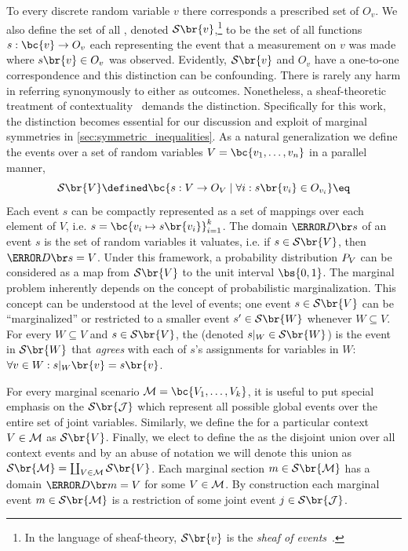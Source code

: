 \documentclass[aps, 10pt, english, twoside, pra, nofootinbib, tightenlines, longbibliography, superscriptaddress]{revtex4-1}
\renewcommand{\Events}[1]{\mathcal{S}\br{#1}} %
\begin{document}
    To every discrete random variable $v$ there corresponds a prescribed set of  $O_v$. We also define the set of all , denoted $\Events{v}$,\footnote{In the language of sheaf-theory, $\Events{v}$ is the \textit{sheaf of events}~\cite{Abramsky_2011}.} to be the set of all functions $s : \bc{v} \to O_v$ each representing the event that a measurement on $v$ was made where $s\br{v} \in O_v$ was observed. Evidently, $\Events{v}$ and $O_v$ have a one-to-one correspondence and this distinction can be confounding. There is rarely any harm in referring synonymously to either as outcomes. Nonetheless, a sheaf-theoretic treatment of contextuality~\cite{Abramsky_2011} demands the distinction.
    Specifically for this work, the distinction becomes essential for our discussion and exploit of marginal symmetries in \cref{sec:symmetric_inequalities}. As a natural generalization we define the events over a set of random variables $V = \bc{v_1, \ldots, v_n}$ in a parallel manner,
    \[ \Events{V} \defined \bc{s: V \to O_{V} \mid \forall i : s\br{v_i} \in O_{v_i} } \eq \label{eq:outcome_space}\]
    Each event $s$ can be compactly represented as a set of mappings over each element of $V$, i.e. $s = \bc{v_i\mapsto s\br{v_i}}_{i = 1}^{k}$. The domain $\Dom{s}$ of an event $s$ is the set of random variables it valuates, i.e. if $s \in \Events{V}$, then $\Dom{s} = V$. Under this framework, a probability distribution $\prob[V]$ can be considered as a map from $\Events{V}$ to the unit interval $\bs{0,1}$.
    The marginal problem inherently depends on the concept of probabilistic marginalization. This concept can be understood at the level of events; one event $s \in \Events{V}$ can be ``marginalized'' or restricted to a smaller event $s' \in \Events{W}$ whenever $W \subseteq V$. For every $W \subseteq V$ and $s \in \Events{V}$, the  (denoted $s|_{W} \in \Events{W}$) is the event in $\Events{W}$ that \textit{agrees} with each of $s$'s assignments for variables in $W$: $\forall v \in W : s|_{W}\br{v} = s\br{v}$.

    For every marginal scenario $\mscenario = \bc{V_1, \ldots, V_k}$, it is useful to put special emphasis on the  $\Events{\jointvar}$ which represent all possible global events over the entire set of joint variables. Similarly, we define the  for a particular context $V \in \mathcal{M}$ as $\Events{V}$. Finally, we elect to define the  as the disjoint union over all context events and by an abuse of notation we will denote this union as $\Events{\mscenario} = \coprod_{V \in \mscenario} \Events{V}$. Each marginal section $m \in \Events{\mscenario}$ has a domain $\Dom{m} = V$ for some $V \in \mathcal{M}$. By construction each marginal event $m \in \Events{\mscenario}$ is a restriction of some joint event $j \in \Events{\jointvar}$.
\end{document}
